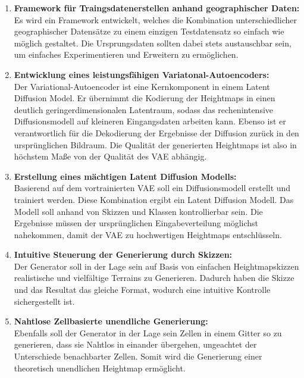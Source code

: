 \begin{enumerate}
    \item \textbf {Framework für Traingsdatenerstellen anhand geographischer Daten:} \\
    Es wird ein Framework entwickelt, welches die Kombination unterschiedlicher geographischer Datensätze zu einem einzigen Testdatensatz so einfach wie möglich gestaltet. Die Ursprungsdaten sollten dabei stets austauschbar sein, um einfaches Experimentieren und Erweitern zu ermöglichen.

    \item \textbf {Entwicklung eines leistungsfähigen Variatonal-Autoencoders:} \\
    Der Variational-Autoencoder ist eine Kernkomponent in einem Latent Diffusion Model. Er übernimmt die Kodierung der Heightmaps in einen deutlich geringerdimensionalen Latentraum, sodass das rechenintensive Diffusionsmodell auf kleineren Eingangsdaten arbeiten kann. Ebenso ist er verantwortlich für die Dekodierung der Ergebnisse der Diffusion zurück in den ursprünglichen Bildraum. Die Qualität der generierten Heightmaps ist also in höchstem Maße von der Qualität des VAE abhängig.

    \item \textbf {Erstellung eines mächtigen Latent Diffusion Modells:} \\
    Basierend auf dem vortrainierten VAE soll ein Diffusionsmodell erstellt und trainiert werden. Diese Kombination ergibt ein Latent Diffusion Modell.
    Das Modell soll anhand von Skizzen und Klassen kontrollierbar sein. Die Ergebnisse müssen der ursprünglichen Eingabeverteilung möglichst nahekommen, damit der VAE zu hochwertigen Heightmaps entschlüsseln.
    
    \item \textbf {Intuitive Steuerung der Generierung durch Skizzen:} \\
    Der Generator soll in der Lage sein auf Basis von einfachen Heightmapskizzen realistische und vielfältige Terrains zu Generieren. Dadurch haben die Skizze und das Resultat das gleiche Format, wodurch eine intuitive Kontrolle sichergestellt ist.

    \item \textbf {Nahtlose Zellbasierte unendliche Generierung:} \\
    Ebenfalls soll der Generator in der Lage sein Zellen in einem Gitter so zu generieren, dass sie Nahtlos in einander übergehen, ungeachtet der Unterschiede benachbarter Zellen. Somit wird die Generierung einer theoretisch unendlichen Heightmap ermöglicht.
     
\end{enumerate}

